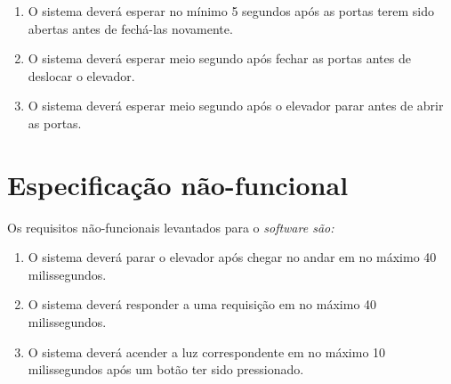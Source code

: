 \begin{enumerate}[label=RF \arabic*. , ref=\arabic*]
\begin{enumerate}[label*=\arabic*.]
  \end{enumerate}
  \item O sistema deverá esperar no mínimo 5 segundos após as portas terem sido abertas antes de fechá-las novamente.
  \item O sistema deverá esperar meio segundo após fechar as portas antes de deslocar o elevador.
  \item O sistema deverá esperar meio segundo após o elevador parar antes de abrir as portas.
\end{enumerate}

\section{Especificação não-funcional}
\label{sec:espec_nao_funcional}

Os requisitos não-funcionais levantados para o \it{software} são:

\begin{enumerate}[label=RNF \arabic*. , ref=\arabic*]
  \item O sistema deverá parar o elevador após chegar no andar em no máximo 40 milissegundos.
  \item O sistema deverá responder a uma requisição em no máximo 40 milissegundos.
  \item O sistema deverá acender a luz correspondente em no máximo 10 milissegundos após um botão ter sido pressionado.
\end{enumerate}








